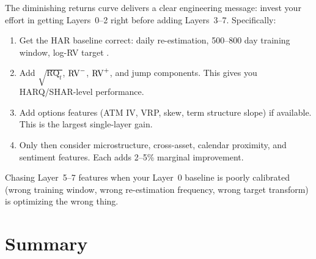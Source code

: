 \begin{keyidea}
The diminishing returns curve delivers a clear engineering message: invest your effort in getting Layers~0--2 right before adding Layers~3--7.
Specifically:
\begin{enumerate}[nosep]
  \item Get the HAR baseline correct: daily re-estimation, 500--800 day training window, log-RV target \citep{HARdToBeat2024}.
  \item Add $\sqrt{\operatorname{RQ}_t}$, $\operatorname{RV}^-$, $\operatorname{RV}^+$, and jump components. This gives you HARQ/SHAR-level performance.
  \item Add options features (ATM IV, VRP, skew, term structure slope) if available. This is the largest single-layer gain.
  \item Only then consider microstructure, cross-asset, calendar proximity, and sentiment features. Each adds 2--5\% marginal improvement.
\end{enumerate}
Chasing Layer~5--7 features when your Layer~0 baseline is poorly calibrated (wrong training window, wrong re-estimation frequency, wrong target transform) is optimizing the wrong thing.
\end{keyidea}

\section{Summary}\label{sec:feat-summary}

